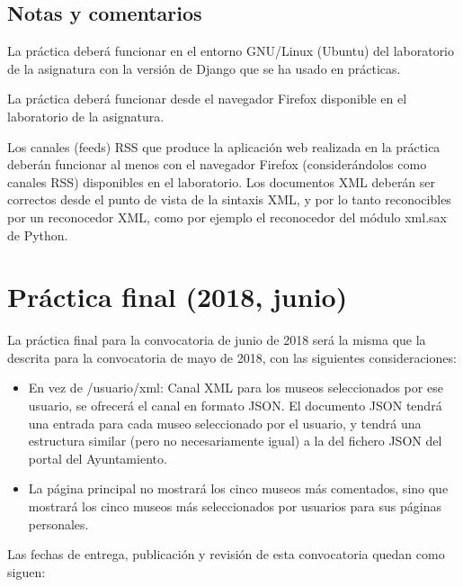 \subsection{Notas y comentarios}

La práctica deberá funcionar en el entorno GNU/Linux (Ubuntu) del laboratorio de la asignatura con la versión de Django que se ha usado en prácticas.

La práctica deberá funcionar desde el navegador Firefox disponible en el laboratorio de la asignatura.

Los canales (feeds) RSS que produce la aplicación web realizada en la práctica deberán funcionar al menos con el navegador Firefox (considerándolos como canales RSS) disponibles en el laboratorio. Los documentos XML deberán ser correctos desde el punto de vista de la sintaxis XML, y por lo tanto reconocibles por un reconocedor XML, como por ejemplo el reconocedor del módulo xml.sax de Python.


\section{Práctica final (2018, junio)}
\label{practica-final-2018-06}

La práctica final para la convocatoria de junio de 2018 será la misma que la descrita para la convocatoria de mayo de 2018, con las siguientes consideraciones:

\begin{itemize}
  \item En vez de /{usuario}/xml: Canal XML para los museos seleccionados por ese usuario, se ofrecerá el canal en formato JSON. El documento JSON tendrá una entrada para cada museo seleccionado por el usuario, y tendrá una estructura similar (pero no necesariamente igual) a la del fichero JSON del portal del Ayuntamiento.
  \item La página principal no mostrará los cinco museos más comentados, sino que mostrará los cinco museos más seleccionados por usuarios para sus páginas personales.
\end{itemize}

Las fechas de entrega, publicación y revisión de esta convocatoria quedan como siguen:

